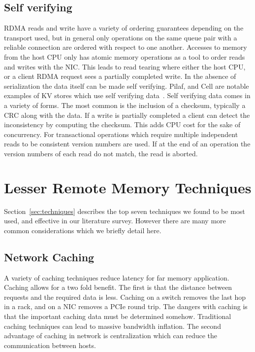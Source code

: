 \subsection{Self verifying} RDMA reads and write have a variety of ordering
guarantees depending on the transport used, but in general only operations on
the same queue pair with a reliable connection are ordered with respect to one
another. Accesses to memory from the host CPU only has atomic memory operations
as a tool to order reads and writes with the NIC. This leads to read tearing
where either the host CPU, or a client RDMA request sees a partially completed
write. In the absence of serialization the data itself can be made self
verifying.  Pilaf, and Cell are notable examples of KV stores which use self
verifying data~\cite{pilaf,cell}. Self verifying data comes in a variety of
forms. The most common is the inclusion of a checksum, typically a CRC along
with the data. If a write is partially completed a client can detect the
inconsistency by computing the checksum. This adds CPU cost for the sake of
concurrency. For transactional operations which require multiple independent reads
to be consistent version numbers are used. If at the end of an operation the
version numbers of each read do not match, the read is aborted.


\section{Lesser Remote Memory Techniques}
\label{sec:additional}


Section~\ref{sec:techniques} describes the top seven techniques we found to be
most used, and effective in our literature survey. However there are many more
common considerations which we briefly detail here.

\subsection{Network Caching} A variety of caching techniques reduce latency for far memory
application. Caching allows for a two fold benefit. The first is that the
distance between requests and the required data is less. Caching on a switch
removes the last hop in a rack, and on a NIC removes a PCIe round trip. The
dangers with caching is that the important caching data must be determined
somehow. Traditional caching techniques can lead to massive bandwidth inflation.
The second advantage of caching in network is centralization which can reduce
the communication between hosts.

